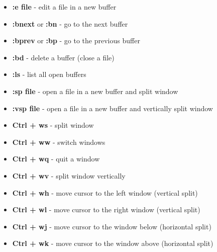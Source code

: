 \documentclass[landscape,twocolumn]{article}
\providecommand{\tightlist}{%
  \setlength{\itemsep}{0pt}\setlength{\parskip}{0pt}}
\begin{document}
\begin{itemize}
\tightlist
\item
  \textbf{:e file} - edit a file in a new buffer
\item
  \textbf{:bnext} or \textbf{:bn} - go to the next buffer
\item
  \textbf{:bprev} or \textbf{:bp} - go to the previous buffer
\item
  \textbf{:bd} - delete a buffer (close a file)
\item
  \textbf{:ls} - list all open buffers
\item
  \textbf{:sp file} - open a file in a new buffer and split window
\item
  \textbf{:vsp file} - open a file in a new buffer and vertically split
  window
\item
  \textbf{Ctrl + ws} - split window
\item
  \textbf{Ctrl + ww} - switch windows
\item
  \textbf{Ctrl + wq} - quit a window
\item
  \textbf{Ctrl + wv} - split window vertically
\item
  \textbf{Ctrl + wh} - move cursor to the left window (vertical split)
\item
  \textbf{Ctrl + wl} - move cursor to the right window (vertical split)
\item
  \textbf{Ctrl + wj} - move cursor to the window below (horizontal
  split)
\item
  \textbf{Ctrl + wk} - move cursor to the window above (horizontal
  split)
\end{itemize}
\end{document}
